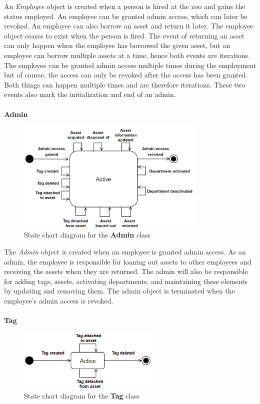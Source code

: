 An \textit{Employee} object is created when a person is hired at the zoo and gains the status employed. An employee can be granted admin access, which can later be revoked. An employee can also borrow an asset and return it later. The employee object ceases to exist when the person is fired. The event of returning an asset can only happen when the employee has borrowed the given asset, but an employee can borrow multiple assets at a time, hence both events are iterations.\\
The employee can be granted admin access multiple times during the employment but of course, the access can only be revoked after the access has been granted. Both things can happen multiple times and are therefore iterations. These two events also mark the initialization and end of an admin.
\\\\

\large{\textbf{Admin}}
\begin{figure}[H]
    \centering
    \includegraphics[width=0.8\textwidth]{figures/StateCharts/Admin_state_chart.png}
    \caption{State chart diagram for the \textbf{Admin} class}
    \label{fig:admin_statechart}
\end{figure}

The \textit{Admin} object is created when an employee is granted admin access. As an admin, the employee is responsible for loaning out assets to other employees and receiving the assets when they are returned. The admin will also be responsible for adding tags, assets, activating departments, and maintaining these elements by updating and removing them. The admin object is terminated when the employee's admin access is revoked.
\\\\

\large{\textbf{Tag}}
\begin{figure}[H]
    \centering
    \includegraphics[width=0.6\textwidth]{figures/StateCharts/Tag_state_chart.png}
    \caption{State chart diagram for the \textbf{Tag} class}
    \label{fig:loan_statechart}
\end{figure}

